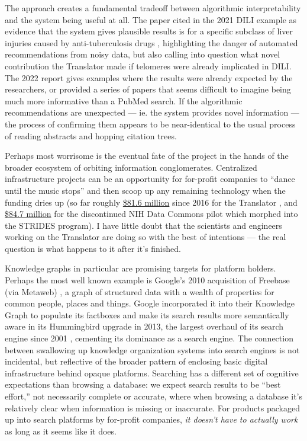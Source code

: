 The approach creates a fundamental tradeoff between algorithmic
interpretability and the system being useful at all. The paper cited in
the 2021 DILI example as evidence that the system gives plausible
results is for a specific subclass of liver injuries caused by
anti-tuberculosis drugs \citep{udomsinprasertLeukocyteTelomereLength2020} , highlighting the danger
of automated recommendations from noisy data, but also calling into
question what novel contribution the Translator made if telomeres were
already implicated in DILI. The 2022 report gives examples where the
results were already expected by the researchers, or provided a series
of papers that seems difficult to imagine being much more informative
than a PubMed search. If the algorithmic recommendations are unexpected
--- ie. the system provides novel information --- the process of
confirming them appears to be near-identical to the usual process of
reading abstracts and hopping citation trees.

Perhaps most worrisome is the eventual fate of the project in the hands
of the broader ecosystem of orbiting information conglomerates.
Centralized infrastructure projects can be an opportunity for for-profit
companies to ``dance until the music stops'' and then scoop up any
remaining technology when the funding dries up (so far roughly
\href{https://reporter.nih.gov/search/kDJ97zGUFEaIBIltUmyd_Q/projects?sort_field=FiscalYear\&sort_order=desc}{\$81.6
million} since 2016 for the Translator \citep{RePORTRePORTERBiomedical2021} , and
\href{https://reporter.nih.gov/search/H4LxgMGK9kGw6SeWCom85Q/projects?shared=true}{\$84.7
million} for the discontinued NIH Data Commons pilot which morphed into
the STRIDES program). I have little doubt that the scientists and
engineers working on the Translator are doing so with the best of
intentions --- the real question is what happens to it after it's
finished.

Knowledge graphs in particular are promising targets for platform
holders. Perhaps the most well known example is Google's 2010
acquisition of Freebase (via Metaweb) \citep{subramanianGoogleBuysFreebase2010} , a graph of structured data with
a wealth of properties for common people, places and things. Google
incorporated it into their Knowledge Graph \citep{IntroducingKnowledgeGraph2012}  to populate its factboxes and make
its search results more semantically aware in its Hummingbird upgrade in
2013, the largest overhaul of its search engine since 2001 \citep{sullivanFAQAllNew2013} , cementing its dominance as a search engine.
The connection between swallowing up knowledge organization systems into
search engines is not incidental, but reflective of the broader pattern
of enclosing basic digital infrastructure behind opaque platforms.
Searching has a different set of cognitive expectations than browsing a
database: we expect search results to be ``best effort,'' not
necessarily complete or accurate, where when browsing a database it's
relatively clear when information is missing or inaccurate. For products
packaged up into search platforms by for-profit companies, \emph{it
doesn't have to actually work} as long as it seems like it does.

